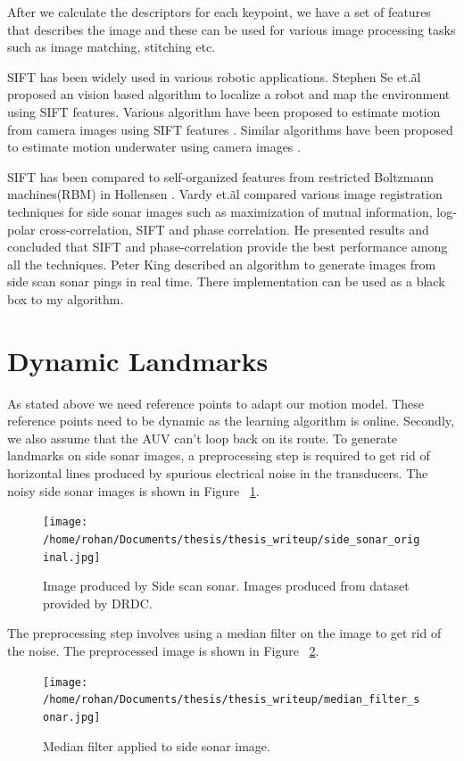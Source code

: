 \documentclass[12pt]{dalcsthesis}
\begin{document}
After we calculate the descriptors for each keypoint, we have a set of features that describes the image and these can be used for various image processing tasks such as image matching, stitching etc. 

SIFT has  been widely used in various robotic applications. Stephen Se et.\~al \cite{se2001vision} proposed an vision based algorithm to localize a robot and map the environment using SIFT features. Various algorithm have been proposed to estimate motion from camera images using SIFT features \cite{barfoot2005online} \cite{scaramuzza2008appearance}. Similar algorithms have been proposed to estimate motion underwater using camera images \cite{Silva}.

SIFT has been compared to self-organized features from restricted Boltzmann machines(RBM) in Hollensen \cite{hollesen2011comparison}. Vardy et.\~al \cite{vandrish2011side} compared various image registration techniques for side sonar images such as  maximization of mutual information, log-polar cross-correlation, SIFT and phase correlation. He presented results and concluded that SIFT and phase-correlation provide the best performance among all the techniques. Peter King \cite{king2012real} described an algorithm to generate images from side scan sonar pings in real time. There implementation can be used as a black box to my algorithm.


\section{Dynamic Landmarks}
\label{ch-: dynamic landmarks}

As stated above we need reference points to adapt our motion model. These reference points need to be dynamic as the learning algorithm is online. Secondly, we also assume that the AUV can't loop back on its route. To generate landmarks on side sonar images, a preprocessing step is required to get rid of horizontal lines produced by spurious electrical noise in the transducers. The noisy side sonar images is shown in Figure ~\ref{fig- side sonar image original}.

\begin{figure}
  \centering
     {\texttt{[image: /home/rohan/Documents/thesis/thesis\_writeup/side\_sonar\_original.jpg]}}
  \caption{\label{fig- side sonar image original} Image produced by Side scan sonar. Images produced from dataset provided by DRDC.}
\end{figure}


The preprocessing step involves using a median filter on the image to get rid of the noise. The preprocessed image is shown in Figure ~\ref{fig- side sonar median}.
\begin{figure}
  \centering
     {\texttt{[image: /home/rohan/Documents/thesis/thesis\_writeup/median\_filter\_sonar.jpg]}}
  \caption{\label{fig- side sonar median} Median filter applied to side sonar image.}
\end{figure}
\end{document}
